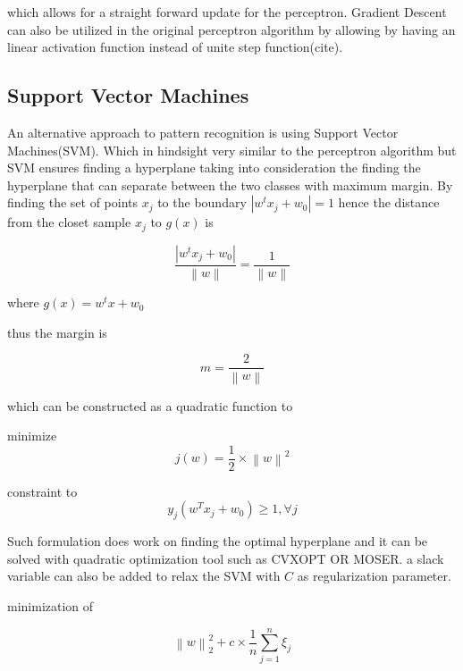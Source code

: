 \documentclass[10pt,twocolumn,letterpaper]{article}
\begin{document}
which allows for a straight forward update for the perceptron. Gradient Descent can also be utilized in the original perceptron algorithm by allowing by having an linear activation function instead of unite step function(cite). 

\subsection{Support Vector Machines}

An alternative approach to pattern recognition is using Support Vector Machines(SVM). Which in hindsight very similar to the perceptron algorithm but SVM ensures finding a hyperplane taking into consideration the finding the hyperplane that can separate between the two classes with maximum margin. By finding the set of points $x_{j}$ to the boundary $\left| w^{t}x_{j}+w_{0}\right| =1$ hence the distance from the closet sample $x_{j}$ to $g(x)$ is 

\begin{equation}
\dfrac{\left| w^{t}x_{j}+w_{0}\right| }{\left\| w\right\| }=\dfrac{1}{\left\| w\right\| }
\end{equation}

where $g\left( x\right) =w^{t}x+w_{0}$

thus the margin is 

\begin{equation}
m=\dfrac{2}{\left\| w\right\| }
\end{equation}


which can be constructed as a quadratic function to 

minimize 
\begin{equation}
j\left( w\right) =\dfrac{1}{2}\times \left\| w\right\| ^{2}
\end{equation}

constraint to 
\begin{equation}
y_{j}\left( w^{T}x_{j}+w_{0}\right) \geq 1 , \forall j
\end{equation}

Such formulation does work on finding the optimal hyperplane and it can be solved with quadratic optimization tool such as CVXOPT OR MOSER. a slack variable can also be added to relax the SVM with $C$ as regularization parameter. 

minimization of 

\begin{equation}
\left\| w\right\| _{2}^{2}+c\times \dfrac{1}{n}\sum ^{n}_{j=1}\xi _{j}
\end{equation}
\end{document}
